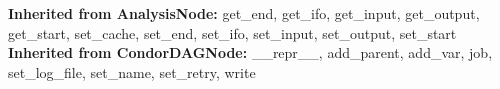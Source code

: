   \textbf{Inherited from AnalysisNode:}
    get\_end,
    get\_ifo,
    get\_input,
    get\_output,
    get\_start,
    set\_cache,
    set\_end,
    set\_ifo,
    set\_input,
    set\_output,
    set\_start
    \\
  \textbf{Inherited from CondorDAGNode:}
    \_\_repr\_\_,
    add\_parent,
    add\_var,
    job,
    set\_log\_file,
    set\_name,
    set\_retry,
    write
